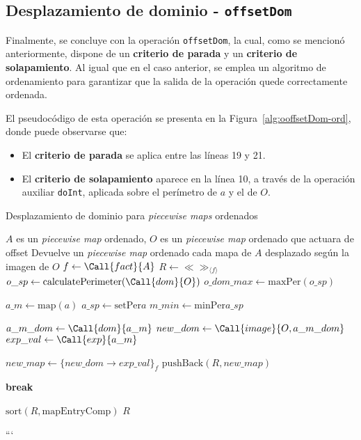\subsection{Desplazamiento de dominio - \texttt{offsetDom}}

Finalmente, se concluye con la operación \texttt{offsetDom}, la cual, como se mencionó anteriormente, dispone de un \textbf{criterio de parada} y un \textbf{criterio de solapamiento}. Al igual que en el caso anterior, se emplea un algoritmo de ordenamiento para garantizar que la salida de la operación quede correctamente ordenada.

El pseudocódigo de esta operación se presenta en la Figura~\ref{alg:ooffsetDom-ord}, donde puede observarse que:

\begin{itemize}
    \item El \textbf{criterio de parada} se aplica entre las líneas 19 y 21.
    \item El \textbf{criterio de solapamiento} aparece en la línea 10, a través de la operación auxiliar \texttt{doInt}, aplicada sobre el perímetro de $a$ y el de $O$.
\end{itemize}



\begin{algorithm}
\caption{Desplazamiento de dominio para \textit{piecewise maps} ordenados}
\label{alg:ooffsetDom-ord}
\begin{algorithmic}[1]
\Require $A$ es un \textit{piecewise map} ordenado, $O$ es un \textit{piecewise map} ordenado que actuara de offset
\Ensure Devuelve un \textit{piecewise map} ordenado cada mapa de $A$ desplazado según la imagen de $O$
    \State $f \gets \Call{fact}{A}$
    \State $R \gets \ll\gg_{\langle f \rangle}$
    \State $o\_sp \gets \mathrm{calculatePerimeter}(\Call{dom}{O})$
    \State $o\_dom\_max \gets \mathrm{maxPer}(o\_sp)$
    
        \State $a\_m \gets\mathrm{map}(a)$
        \State $a\_sp \gets \mathrm{setPer}{a}$
        \State $m\_min \gets\mathrm{minPer}{a\_sp}$

            \State $a\_m\_dom \gets \Call{dom}{a\_m}$
            \State $new\_dom \gets \Call{image}{O, a\_m\_dom}$
            \State $exp\_val \gets \Call{exp}{a\_m}$

                \State $new\_map \gets \{new\_dom \rightarrow exp\_val\}_f$
                \State $\mathrm{pushBack}(R,new\_map)$ 
            \EndIf
        \EndIf

            \State \textbf{break} \EndIf
    \EndFor

    \State $\mathrm{sort}(R, \mathrm{mapEntryComp})$
    \State \Return $R$
\EndFunction
\end{algorithmic}
\end{algorithm}
```
